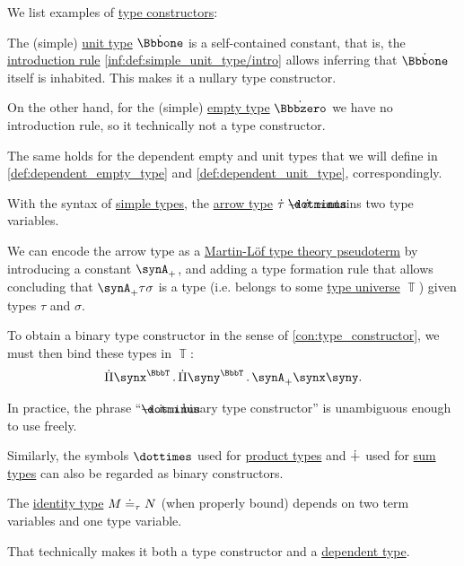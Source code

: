 \begin{example}\label{ex:con:type_constructor}
  We list examples of \hyperref[con:type_constructor]{type constructors}:
  \begin{thmenum}
     The (simple) \hyperref[def:simple_unit_type]{unit type} \( \syn\Bbbone \) is a self-contained constant, that is, the \hyperref[rem:type_theory_rule_classification/intro]{introduction rule} \ref{inf:def:simple_unit_type/intro} allows inferring that \( \syn\Bbbone \) itself is inhabited. This makes it a nullary type constructor.

    On the other hand, for the (simple) \hyperref[def:simple_empty_type]{empty type} \( \syn\Bbbzero \) we have no introduction rule, so it technically not a type constructor.

    The same holds for the dependent empty and unit types that we will define in \cref{def:dependent_empty_type} and \cref{def:dependent_unit_type}, correspondingly.

     With the syntax of \hyperref[def:simple_type]{simple types}, the \hyperref[def:arrow_type]{arrow type} \( \syn\tau \synimplies \syn\sigma \) contains two type variables.

    We can encode the arrow type as a \hyperref[rem:pseudoterm_schemas]{Martin-L\"of type theory pseudoterm} by introducing a constant \( \synA_+ \), and adding a type formation rule that allows concluding that \( \synA_+ \tau \sigma \) is a type (i.e. belongs to some \hyperref[con:type_universe]{type universe} \( \BbbT \)) given types \( \tau \) and \( \sigma \).

    To obtain a binary type constructor in the sense of \cref{con:type_constructor}, we must then bind these types in \( \BbbT \):
    \begin{equation*}
      \qprod {\synx^{\BbbT}} \qprod {\syny^{\BbbT}} \synA_+ \synx \syny.
    \end{equation*}

    In practice, the phrase \enquote{\( {\synimplies} \) is a binary type constructor} is unambiguous enough to use freely.

    Similarly, the symbols \( {\syntimes} \) used for \hyperref[def:simple_product_type]{product types} and \( {\mathbin{\dotplus}} \) used for \hyperref[def:simple_sum_type]{sum types} can also be regarded as binary constructors.

     The \hyperref[def:identity_type]{identity type} \( M \doteq_\tau N \) (when properly bound) depends on two term variables and one type variable.

    That technically makes it both a type constructor and a \hyperref[con:dependent_type]{dependent type}.
  \end{thmenum}
\end{example}

